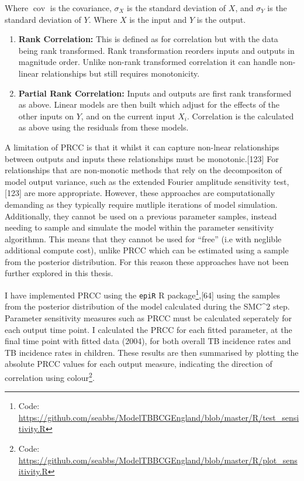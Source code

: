 \documentclass[11pt,twoside]{bristolthesis}
\begin{document}
  Where \(\operatorname {cov}\) is the covariance, \(\sigma _{X}\) is the standard deviation of \(X\), and \(\sigma_Y\) is the standard deviation of \(Y\). Where \(X\) is the input and \(Y\) is the output.
  \begin{enumerate}
  \def\labelenumi{\arabic{enumi}.}
  \setcounter{enumi}{1}
  \item
    \textbf{Rank Correlation:} This is defined as for correlation but with the data being rank transformed. Rank transformation reorders inputs and outputs in magnitude order. Unlike non-rank transformed correlation it can handle non-linear relationships but still requires monotonicity.
  \item
    \textbf{Partial Rank Correlation:} Inputs and outputs are first rank transformed as above. Linear models are then built which adjust for the effects of the other inputs on \(Y\), and on the current input \(X_i\). Correlation is the calculated as above using the residuals from these models.
  \end{enumerate}
  A limitation of PRCC is that it whilst it can capture non-lnear relationships between outputs and inputs these relationships must be monotonic.{[}123{]} For relationships that are non-monotic methods that rely on the decompositon of model output variance, such as the extended Fourier amplitude sensitivity test,{[}123{]} are more appropriate. However, these approaches are computationally demanding as they typically require mutliple iterations of model simulation. Additionally, they cannot be used on a previous parameter samples, instead needing to sample and simulate the model within the parameter sensitivity algorithmn. This means that they cannot be used for ``free'' (i.e with neglible additional compute cost), unlike PRCC which can be estimated using a sample from the posterior distribution. For this reason these approaches have not been further explored in this thesis.
  
  I have implemented PRCC using the \texttt{epiR} R package\footnote{Code: \url{https://github.com/seabbs/ModelTBBCGEngland/blob/master/R/test_sensitivity.R}},{[}64{]} using the samples from the posterior distribution of the model calculated during the SMC\^{}2 step. Parameter sensitivity measures such as PRCC must be calculated seperately for each output time point. I calculated the PRCC for each fitted parameter, at the final time point with fitted data (2004), for both overall TB incidence rates and TB incidence rates in children. These results are then summarised by plotting the absolute PRCC values for each output measure, indicating the direction of correlation using colour\footnote{Code: \url{https://github.com/seabbs/ModelTBBCGEngland/blob/master/R/plot_sensitivity.R}}.
  
\end{document}
